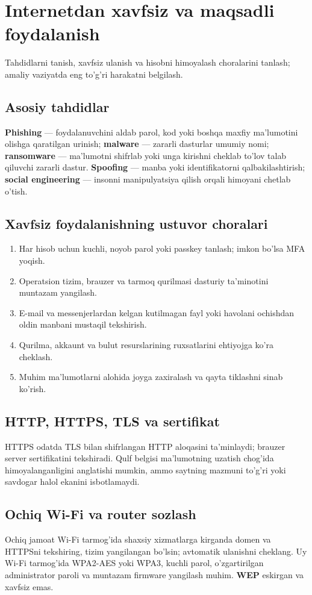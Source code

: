 \documentclass[11pt,a4paper,oneside]{book}
\newcommand{\kw}[1]{\textbf{\color{Deep}#1}}
\begin{document}
\chapter{Internetdan xavfsiz va maqsadli foydalanish}
\begin{goal}Tahdidlarni tanish, xavfsiz ulanish va hisobni himoyalash choralarini tanlash; amaliy vaziyatda eng to'g'ri harakatni belgilash.\end{goal}
\section{Asosiy tahdidlar}
\kw{Phishing} — foydalanuvchini aldab parol, kod yoki boshqa maxfiy ma'lumotini olishga qaratilgan urinish; \kw{malware} — zararli dasturlar umumiy nomi; \kw{ransomware} — ma'lumotni shifrlab yoki unga kirishni cheklab to'lov talab qiluvchi zararli dastur. \kw{Spoofing} — manba yoki identifikatorni qalbakilashtirish; \kw{social engineering} — insonni manipulyatsiya qilish orqali himoyani chetlab o'tish.
\section{Xavfsiz foydalanishning ustuvor choralari}
\begin{enumerate}
\item Har hisob uchun kuchli, noyob parol yoki passkey tanlash; imkon bo'lsa MFA yoqish.
\item Operatsion tizim, brauzer va tarmoq qurilmasi dasturiy ta'minotini muntazam yangilash.
\item E-mail va messenjerlardan kelgan kutilmagan fayl yoki havolani ochishdan oldin manbani mustaqil tekshirish.
\item Qurilma, akkaunt va bulut resurslarining ruxsatlarini ehtiyojga ko'ra cheklash.
\item Muhim ma'lumotlarni alohida joyga zaxiralash va qayta tiklashni sinab ko'rish.
\end{enumerate}
\section{HTTP, HTTPS, TLS va sertifikat}
HTTPS odatda TLS bilan shifrlangan HTTP aloqasini ta'minlaydi; brauzer server sertifikatini tekshiradi. Qulf belgisi ma'lumotning uzatish chog'ida himoyalanganligini anglatishi mumkin, ammo saytning mazmuni to'g'ri yoki savdogar halol ekanini isbotlamaydi.
\section{Ochiq Wi-Fi va router sozlash}
Ochiq jamoat Wi-Fi tarmog'ida shaxsiy xizmatlarga kirganda domen va HTTPSni tekshiring, tizim yangilangan bo'lsin; avtomatik ulanishni cheklang. Uy Wi-Fi tarmog'ida WPA2-AES yoki WPA3, kuchli parol, o'zgartirilgan administrator paroli va muntazam firmware yangilash muhim. \kw{WEP} eskirgan va xavfsiz emas.
\end{document}
